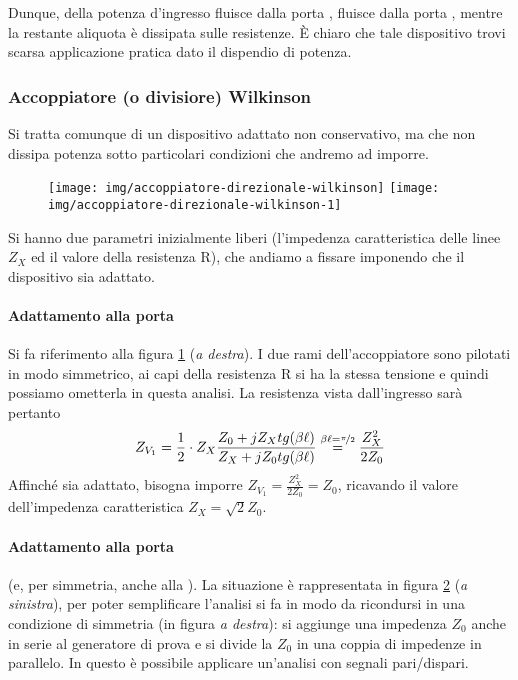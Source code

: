 Dunque, della potenza d'ingresso  fluisce dalla porta ,  fluisce dalla porta , mentre la restante aliquota è dissipata sulle resistenze. È chiaro che tale dispositivo trovi scarsa applicazione pratica dato il dispendio di potenza.

\subsubsection{Accoppiatore (o divisiore) Wilkinson}
Si tratta comunque di un dispositivo adattato non conservativo, ma che non dissipa potenza sotto particolari condizioni che andremo ad imporre.
\begin{figure}[hbt]
	\centering
	\texttt{[image: img/accoppiatore-direzionale-wilkinson]}
	\texttt{[image: img/accoppiatore-direzionale-wilkinson-1]}
	\caption{}
	\label{fig:accoppiatore-direzionale-wilkinson}
\end{figure}

Si hanno due parametri inizialmente liberi (l'impedenza caratteristica delle linee $Z_X$ ed il valore della resistenza R), che andiamo a fissare imponendo che il dispositivo sia adattato.

\paragraph{Adattamento alla porta } Si fa riferimento alla figura 	\ref{fig:accoppiatore-direzionale-wilkinson} (\textit{a destra}). I due rami dell'accoppiatore sono pilotati in modo simmetrico, ai capi della resistenza R si ha la stessa tensione e quindi possiamo ometterla in questa analisi. La resistenza vista dall'ingresso sarà pertanto
\[
Z_{V_1} = \frac{1}{2} \cdot Z_X \frac{Z_0 + j Z_X tg(\beta\ell)} {Z_X + j Z_0 tg(\beta\ell)}
\overset{\beta\ell=\nicefrac{\pi}{2}}{=}
\frac{Z_X^2}{2Z_0}
\]
Affinché sia adattato, bisogna imporre $Z_{V_1} = \frac{Z_X^2}{2Z_0} = Z_0$, ricavando il valore dell'impedenza caratteristica $Z_X =\sqrt{2} Z_0$.

\begin{figure}[hbt]
	\hfill
	\caption{}
	\label{fig:accoppiatore-direzionale-wilkinson-1}
\end{figure}

\paragraph{Adattamento alla porta } (e, per simmetria, anche alla ). La situazione è rappresentata in figura \ref{fig:accoppiatore-direzionale-wilkinson-1} (\textit{a sinistra}), per poter semplificare l'analisi si fa in modo da ricondursi in una condizione di simmetria (in figura \textit{a destra}): si aggiunge una impedenza $Z_0$ anche in serie al generatore di prova e si divide la $Z_0$ in una coppia di impedenze in parallelo. In questo è possibile applicare un'analisi con segnali pari/dispari.

